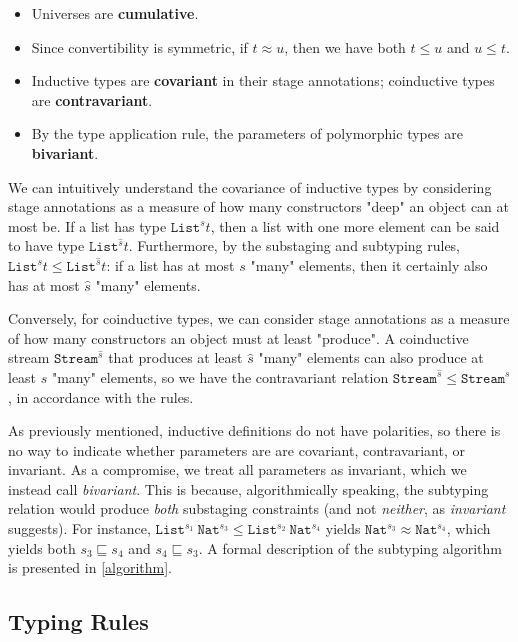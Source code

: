 \documentclass[sigplan,10pt,anonymous,review]{acmart}
\begin{document}
\begin{itemize}
    \item Universes are \textbf{cumulative}. 
    \item Since convertibility is symmetric, if $t \approx u$, then we have both $t \leq u$ and $u \leq t$. 
    \item Inductive types are \textbf{covariant} in their stage annotations; coinductive types are \textbf{contravariant}.  
    \item By the type application rule, the parameters of polymorphic types are \textbf{bivariant}. 
\end{itemize}

We can intuitively understand the covariance of inductive types by considering stage annotations as a measure of how many constructors "deep" an object can at most be. If a list has type $\texttt{List}^s t$, then a list with one more element can be said to have type $\texttt{List}^{\hat{s}} t$. Furthermore, by the substaging and subtyping rules, $\texttt{List}^s t \leq \texttt{List}^{\hat{s}} t$: if a list has at most $s$ "many" elements, then it certainly also has at most $\hat{s}$ "many" elements.

Conversely, for coinductive types, we can consider stage annotations as a measure of how many constructors an object must at least "produce". A coinductive stream $\texttt{Stream}^{\hat{s}}$ that produces at least $\hat{s}$ "many" elements can also produce at least $s$ "many" elements, so we have the contravariant relation $\texttt{Stream}^{\hat{s}} \leq \texttt{Stream}^s$, in accordance with the rules.

As previously mentioned, inductive definitions do not have polarities, so there is no way to indicate whether parameters are are covariant, contravariant, or invariant. As a compromise, we treat all parameters as invariant, which we instead call \textit{bivariant}. This is because, algorithmically speaking, the subtyping relation would produce \textit{both} substaging constraints (and not \textit{neither}, as \textit{invariant} suggests). For instance, $\texttt{List}^{s_1}\ \texttt{Nat}^{s_3} \leq \texttt{List}^{s_2}\ \texttt{Nat}^{s_4}$ yields $\texttt{Nat}^{s_3} \approx \texttt{Nat}^{s_4}$, which yields both $s_3 \sqsubseteq s_4$ and $s_4 \sqsubseteq s_3$. A formal description of the subtyping algorithm is presented in \autoref{algorithm}.

\subsection{Typing Rules}
\end{document}
